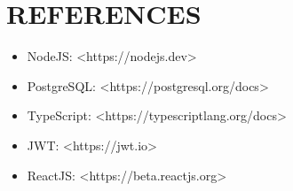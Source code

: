 \section*{REFERENCES}

\begin{itemize}
    \item NodeJS: <https://nodejs.dev>
    \item PostgreSQL: <https://postgresql.org/docs>
    \item TypeScript: <https://typescriptlang.org/docs>
    \item JWT: <https://jwt.io>
    \item ReactJS: <https://beta.reactjs.org>
\end{itemize}
